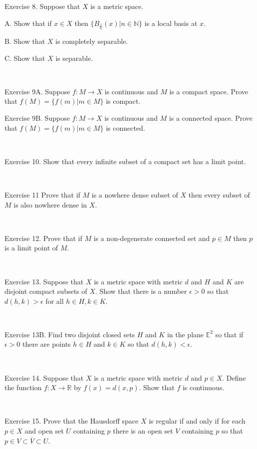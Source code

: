 \documentclass[12pt, std]{article}
\begin{document}
\newpage

Exercise 8.  Suppose that $X$ is a metric space.

\qquad A. Show that if $x \in X$ then $\{B_{\frac 1n}(x) | n \in \mathbb{N} \}$ is a local basis at $x$.

\qquad B. Show that $X$ is completely separable.

\qquad C. Show that $X$ is separable.

\

Exercise 9A. Suppose $f: M \to X$ is continuous and $M$ is a compact space.  Prove that $f(M) = \{ f(m) | m \in M \}$ is compact.

Exercise 9B. Suppose $f: M \to X$ is continuous and $M$ is a connected space.  Prove that $f(M) = \{ f(m) | m \in M \}$ is connected.

\

Exercise 10.  Show that every infinite subset of a compact set has a limit point.

\

Exercise 11  Prove that if $M$ is a nowhere dense subset of $X$ then every subset of $M$
is also nowhere dense in $X$.


\

Exercise 12.  Prove that if $M$ is a non-degenerate connected set and $p \in M$ then $p$
is a limit point of $M$.

\

Exercise 13.  Suppose that $X$ is a metric space with metric $d$ and $H$ and $K$ are disjoint compact subsets of $X$.  Show that there is a number $\epsilon > 0$ so that $d(h, k) > \epsilon$ for all $h \in H, k \in K$.

\

Exercise 13B.  Find two disjoint closed sets $H$ and $K$ in the plane $\mathbb{E}^2$ so that if $\epsilon > 0$ there are points $h \in H$ and $k \in K$ so that $d(h, k) < \epsilon$.

\

Exercise 14.  Suppose that $X$ is a metric space with metric $d$ and $p \in X$.  Define the function $f: X \to \mathbb{R}$ by $f(x) = d(x,p)$.  Show that $f$ is continuous.

\

Exercise 15.  Prove that the Hausdorff space $X$ is regular if and only if for each $p \in X$ and open set $U$ containing $p$ there is an open set $V$ containing $p$ so that $p \in V \subset \overline{V} \subset U$.
\end{document}
